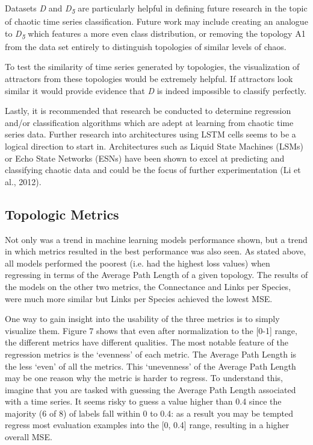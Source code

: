 \documentclass[letterpaper, 10 pt, conference]{ieeeconf}  %
\begin{document}
    Datasets \textit{D} and \textit{D\textsubscript{5}} are particularly helpful in defining future research in the topic of chaotic time series classification. Future work may include creating an analogue to \textit{D\textsubscript{5}} which features a more even class distribution, or removing the topology A1 from the data set entirely to distinguish topologies of similar levels of chaos. 

    To test the similarity of time series generated by topologies, the visualization of attractors from these topologies would be extremely helpful. If attractors look similar it would provide evidence that \textit{D} is indeed impossible to classify perfectly. 
    
    Lastly, it is recommended that research be conducted to determine regression and/or classification algorithms which are adept at learning from chaotic time series data. Further research into architectures using LSTM cells seems to be a logical direction to start in. Architectures such as Liquid State Machines (LSMs) or Echo State Networks (ESNs) have been shown to excel at predicting and classifying chaotic data and could be the focus of further experimentation (Li et al., 2012). 

\subsection{Topologic Metrics}

    Not only was a trend in machine learning models performance shown, but a trend in which metrics resulted in the best performance was also seen. As stated above, all models performed the poorest (i.e. had the highest loss values) when regressing in terms of the Average Path Length of a given topology. The results of the models on the other two metrics, the Connectance and Links per Species, were much more similar but Links per Species achieved the lowest MSE. 

    One way to gain insight into the usability of the three metrics is to simply visualize them. Figure 7 shows that even after normalization to the [0-1] range, the different metrics have different qualities. The most notable feature of the regression metrics is the ‘evenness’ of each metric. The Average Path Length is the less ‘even’ of all the metrics. This ‘unevenness’ of the Average Path Length may be one reason why the metric is harder to regress. To understand this, imagine that you are tasked with guessing the Average Path Length associated with a time series. It seems risky to guess a value higher than 0.4 since the majority (6 of 8) of labels fall within 0 to 0.4: as a result you may be tempted regress most evaluation examples into the [0, 0.4] range, resulting in a higher overall MSE. 
\end{document}
